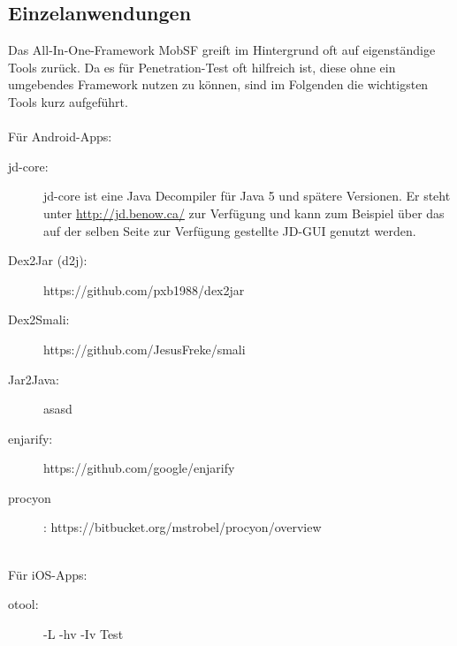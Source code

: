 \subsection{Einzelanwendungen}\label{Pen:Eingelanwendungen}
Das All-In-One-Framework MobSF greift im Hintergrund oft auf eigenständige Tools zurück. Da es für Penetration-Test oft hilfreich ist, diese ohne ein umgebendes Framework nutzen zu können, sind im Folgenden die wichtigsten Tools kurz aufgeführt.
\\\\
Für Android-Apps:
\begin{description}
	\item[jd-core: ]jd-core ist eine Java Decompiler für Java 5 und spätere Versionen. Er steht unter \url{http://jd.benow.ca/} zur Verfügung und kann zum Beispiel über das auf der selben Seite zur Verfügung gestellte JD-GUI genutzt werden.
	\item[Dex2Jar (d2j): ] https://github.com/pxb1988/dex2jar
	\item[Dex2Smali: ] https://github.com/JesusFreke/smali
	\item[Jar2Java: ]asasd
	\item[enjarify: ] https://github.com/google/enjarify
	\item[procyon]: https://bitbucket.org/mstrobel/procyon/overview
\end{description}
$ $\\\\
Für iOS-Apps:
\begin{description}
	\item[otool: ] -L -hv -Iv
		\subitem[-L] Test
\end{description}